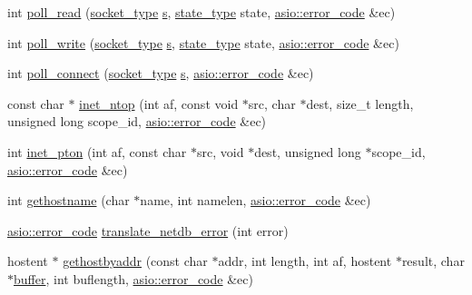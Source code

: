 \begin{DoxyCompactItemize}
int \hyperlink{namespaceasio_1_1detail_1_1socket__ops_a3441fa6568f3c39d69fe5abc8faf490e}{poll\+\_\+read} (\hyperlink{namespaceasio_1_1detail_a6798c771dd84b79798b1a08150706ea9}{socket\+\_\+type} \hyperlink{group__async__connect_ga31ab74b9ea6c77932dddd016cfc7920a}{s}, \hyperlink{namespaceasio_1_1detail_1_1socket__ops_a5ce32ee297edef8833113ea35a933054}{state\+\_\+type} state, \hyperlink{classasio_1_1error__code}{asio\+::error\+\_\+code} \&ec)
\item 
int \hyperlink{namespaceasio_1_1detail_1_1socket__ops_a1558f1c08d7848ba7497490caaf70144}{poll\+\_\+write} (\hyperlink{namespaceasio_1_1detail_a6798c771dd84b79798b1a08150706ea9}{socket\+\_\+type} \hyperlink{group__async__connect_ga31ab74b9ea6c77932dddd016cfc7920a}{s}, \hyperlink{namespaceasio_1_1detail_1_1socket__ops_a5ce32ee297edef8833113ea35a933054}{state\+\_\+type} state, \hyperlink{classasio_1_1error__code}{asio\+::error\+\_\+code} \&ec)
\item 
int \hyperlink{namespaceasio_1_1detail_1_1socket__ops_a8a31b0a147289e44de668e09863073e5}{poll\+\_\+connect} (\hyperlink{namespaceasio_1_1detail_a6798c771dd84b79798b1a08150706ea9}{socket\+\_\+type} \hyperlink{group__async__connect_ga31ab74b9ea6c77932dddd016cfc7920a}{s}, \hyperlink{classasio_1_1error__code}{asio\+::error\+\_\+code} \&ec)
\item 
const char $\ast$ \hyperlink{namespaceasio_1_1detail_1_1socket__ops_a7779e2805d8f2799421f59319746a6a1}{inet\+\_\+ntop} (int af, const void $\ast$src, char $\ast$dest, size\+\_\+t length, unsigned long scope\+\_\+id, \hyperlink{classasio_1_1error__code}{asio\+::error\+\_\+code} \&ec)
\item 
int \hyperlink{namespaceasio_1_1detail_1_1socket__ops_a605dc164e1020d739f5efb9bc1715baf}{inet\+\_\+pton} (int af, const char $\ast$src, void $\ast$dest, unsigned long $\ast$scope\+\_\+id, \hyperlink{classasio_1_1error__code}{asio\+::error\+\_\+code} \&ec)
\item 
int \hyperlink{namespaceasio_1_1detail_1_1socket__ops_a2579b536222ee88f3aa50993568ab52c}{gethostname} (char $\ast$name, int namelen, \hyperlink{classasio_1_1error__code}{asio\+::error\+\_\+code} \&ec)
\item 
\hyperlink{classasio_1_1error__code}{asio\+::error\+\_\+code} \hyperlink{namespaceasio_1_1detail_1_1socket__ops_a7b34f13d6fee250f34f8913f376dc39e}{translate\+\_\+netdb\+\_\+error} (int error)
\item 
hostent $\ast$ \hyperlink{namespaceasio_1_1detail_1_1socket__ops_a2e62efda4d006d21f2f8be8a4de52f93}{gethostbyaddr} (const char $\ast$addr, int length, int af, hostent $\ast$result, char $\ast$\hyperlink{group__buffer_ga1ed66e401559cbfd19595392f653b47c}{buffer}, int buflength, \hyperlink{classasio_1_1error__code}{asio\+::error\+\_\+code} \&ec)

\end{DoxyCompactItemize}
